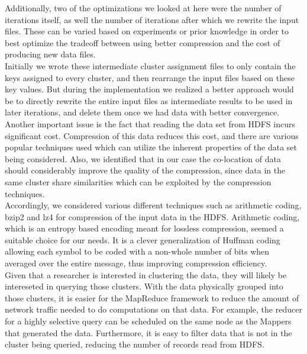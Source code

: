 \documentclass[paper=letter, fontsize=11pt]{scrartcl}
\numberwithin{equation}{section}		%
\numberwithin{figure}{section}			%
\numberwithin{table}{section}				%
\begin{document}
Additionally, two of the optimizations we looked at here were the number of iterations itself, as well the number of iterations after which we rewrite the input files. These can be varied based on experiments or prior knowledge in order to best optimize the tradeoff between using better compression and the cost of producing new data files. \\

Initially we wrote these intermediate cluster assignment files to only contain the keys assigned to every cluster, and then rearrange the input files based on these key values. But during the implementation we realized a better approach would be to directly rewrite the entire input files as intermediate results to be used in later iterations, and delete them once we had data with better convergence. \\

Another important issue is the fact that reading the data set from HDFS incurs significant cost. Compression of this data reduces this cost, and there are various popular techniques used which can utilize the inherent properties of the data set being considered. Also, we identified that in our case the co-location of data should considerably improve the quality of the compression, since data in the same cluster share similarities which can be exploited by the compression techniques. \\

Accordingly, we considered various different techniques such as arithmetic coding, bzip2 and lz4 for compression of the input data in the HDFS. Arithmetic coding, which is an entropy based encoding meant for lossless compression, seemed a suitable choice for our needs. It is a clever generalization of Huffman coding allowing each symbol to be coded with a non-whole number of bits when averaged over the entire message, thus improving compression efficiency. \\

Given that a researcher is interested in clustering the data, they will likely be intereseted in querying those clusters. With the data physically grouped into those clusters, it is easier for the MapReduce framework to reduce the amount of network traffic needed to do computations on that data.  For example, the reducer for a highly selective query can be scheduled on the same node as the Mappers that generated the data. Furthermore, it is easy to filter data that is not in the cluster being queried, reducing the number of records read from HDFS. \\
\end{document}
